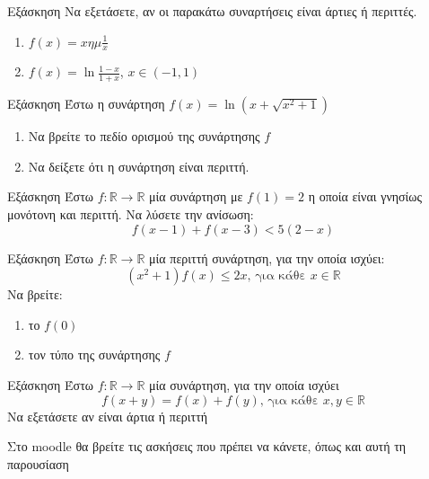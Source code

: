 \documentclass[greek]{beamer}
\begin{document}
\begin{frame}{Εξάσκηση}
      Να εξετάσετε, αν οι παρακάτω συναρτήσεις είναι άρτιες ή περιττές.
      \begin{enumerate}
            \item $f(x)=x ημ \frac{1}{x}$ \pause
            \item $f(x)=\ln \frac{1-x}{1+x}$,  $x\in (-1,1)$
      \end{enumerate}
\end{frame}

\begin{frame}{Εξάσκηση}
      Έστω η συνάρτηση $f(x)=\ln (x+\sqrt{x^2+1})$
      \begin{enumerate}
            \item Να βρείτε το πεδίο ορισμού της συνάρτησης $f$ \pause
            \item Να δείξετε ότι η συνάρτηση είναι περιττή.
      \end{enumerate}
\end{frame}

\begin{frame}{Εξάσκηση}
      Έστω $f:\mathbb{R}\to\mathbb{R}$ μία συνάρτηση με $f(1)=2$ η οποία είναι γνησίως μονότονη και περιττή. Να λύσετε την ανίσωση:
      $$f(x-1)+f(x-3)<5(2-x)$$
\end{frame}

\begin{frame}{Εξάσκηση}
      Έστω $f:\mathbb{R}\to\mathbb{R}$ μία περιττή συνάρτηση, για την οποία ισχύει:
      $$(x^2+1)f(x)\le 2x \text{, για κάθε } x\in\mathbb{R}$$
      Να βρείτε:
      \begin{enumerate}
            \item το $f(0)$ \pause
            \item τον τύπο της συνάρτησης $f$
      \end{enumerate}
\end{frame}

\begin{frame}{Εξάσκηση}
      Έστω $f:\mathbb{R}\to\mathbb{R}$ μία συνάρτηση, για την οποία ισχύει
      $$f(x+y)=f(x)+f(y)\text{, για κάθε } x,y\in\mathbb{R}$$
      Να εξετάσετε αν είναι άρτια ή περιττή
\end{frame}

\begin{frame}
      Στο moodle θα βρείτε τις ασκήσεις που πρέπει να κάνετε, όπως και αυτή τη παρουσίαση
\end{frame}
\end{document}
